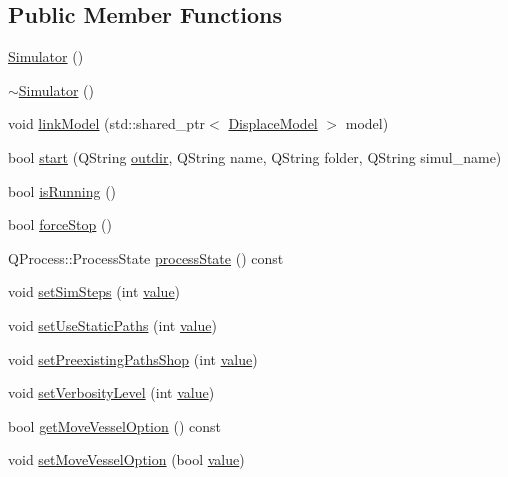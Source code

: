 \subsection*{Public Member Functions}
\begin{DoxyCompactItemize}
\item 
\mbox{\hyperlink{class_simulator_a031573bfcfe2e0f5c9539bcc1c7fc5d9}{Simulator}} ()
\item 
\mbox{\hyperlink{class_simulator_a0f49aa04f42060a785adf77346b9de9f}{$\sim$\+Simulator}} ()
\item 
void \mbox{\hyperlink{class_simulator_ae7e0ad0b8a24447f161c0b940c6783f0}{link\+Model}} (std\+::shared\+\_\+ptr$<$ \mbox{\hyperlink{class_displace_model}{Displace\+Model}} $>$ model)
\item 
bool \mbox{\hyperlink{class_simulator_a6e5e3aa8ca2fffcc4fee463767c710c9}{start}} (Q\+String \mbox{\hyperlink{simulator_2main_8cpp_a5032743b5127232204c872f8f2bda528}{outdir}}, Q\+String name, Q\+String folder, Q\+String simul\+\_\+name)
\item 
bool \mbox{\hyperlink{class_simulator_a166832314a3c4c510c28771372c372b6}{is\+Running}} ()
\item 
bool \mbox{\hyperlink{class_simulator_aeb94927d5a555a6a64170f402f6f4618}{force\+Stop}} ()
\item 
Q\+Process\+::\+Process\+State \mbox{\hyperlink{class_simulator_a2f3c6e304118ae1f881610d1d3eb7f8f}{process\+State}} () const
\item 
void \mbox{\hyperlink{class_simulator_aec75d8a7b833cb24c535f4c49709ff45}{set\+Sim\+Steps}} (int \mbox{\hyperlink{diffusion_8cpp_a4b41795815d9f3d03abfc739e666d5da}{value}})
\item 
void \mbox{\hyperlink{class_simulator_a8a15b607539c98f89c9df86a56acdc0c}{set\+Use\+Static\+Paths}} (int \mbox{\hyperlink{diffusion_8cpp_a4b41795815d9f3d03abfc739e666d5da}{value}})
\item 
void \mbox{\hyperlink{class_simulator_a03e352c3e0da46be50981e32974ec948}{set\+Preexisting\+Paths\+Shop}} (int \mbox{\hyperlink{diffusion_8cpp_a4b41795815d9f3d03abfc739e666d5da}{value}})
\item 
void \mbox{\hyperlink{class_simulator_a931dbff8f5dad50acb05379a0a0b2796}{set\+Verbosity\+Level}} (int \mbox{\hyperlink{diffusion_8cpp_a4b41795815d9f3d03abfc739e666d5da}{value}})
\item 
bool \mbox{\hyperlink{class_simulator_af76678a2bc976025f05f2f3b0be15e07}{get\+Move\+Vessel\+Option}} () const
\item 
void \mbox{\hyperlink{class_simulator_a2d9b64b4027c60d66a010311e007c6e4}{set\+Move\+Vessel\+Option}} (bool \mbox{\hyperlink{diffusion_8cpp_a4b41795815d9f3d03abfc739e666d5da}{value}})

\end{DoxyCompactItemize}
